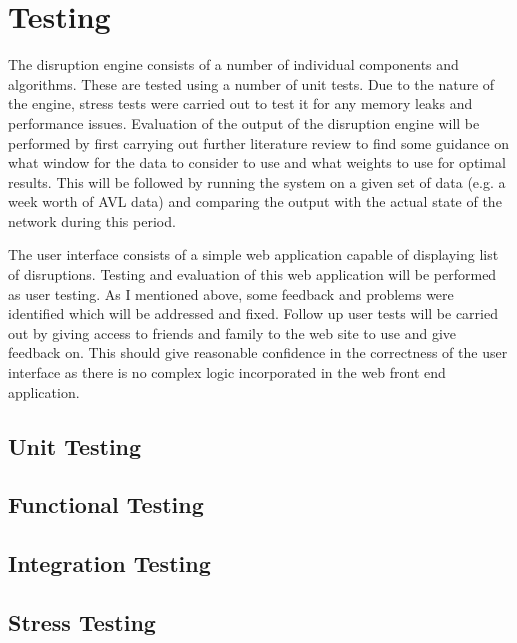 \chapter{Testing}

The disruption engine consists of a number of individual components and algorithms.
These are tested using a number of unit tests. Due to the nature of
the engine, stress tests were carried out to test it for any memory leaks and
performance issues. Evaluation of the output of the disruption engine will be
performed by first carrying out further literature review to find some guidance
on what window for the data to consider to use and what weights to use for
optimal results. This will be followed by running the system on a given set
of data (e.g. a week worth of AVL data) and comparing the output with the
actual state of the network during this period.

The user interface consists of a simple web application capable of displaying
list of disruptions. Testing and evaluation of this web application will be
performed as user testing. As I mentioned above, some feedback and problems
were identified which will be addressed and fixed. Follow up user tests will be
carried out by giving access to friends and family to the web site to use and
give feedback on. This should give reasonable confidence in the correctness of
the user interface as there is no complex logic incorporated in the web front
end application.
\section{Unit Testing}
\section{Functional Testing}
\section{Integration Testing}
\section{Stress Testing}